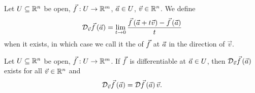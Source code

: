 \documentclass[main.tex]{subfiles}
\begin{document}
\begin{definition}
    Let $U\subseteq \mathbb R^n$ be open, $\vec{f} : U\to \mathbb R^m$, $\vec{a}\in U$, $\vec{v}\in \mathbb R^n$. We define
    \[\mathcal{D}_{\vec{v}}\vec{f}\left( \vec{a} \right) = \lim_{t\to 0} \frac{\vec{f}\left( \vec{a} + t\vec{v} \right) - \vec{f}\left( \vec{a} \right)}{t}\]
    when it exists, in which case we call it the  of $\vec{f}$ at $\vec{a}$ in the direction of $\vec{v}$.
\end{definition}

\begin{theorem}
    Let $U\subseteq \mathbb R^n$ be open, $\vec{f} : U \to \mathbb R^m$. If $\vec{f}$ is differentiable at $\vec{a}\in U$, then $\mathcal{D}_{\vec{v}}\vec{f}\left( \vec{a} \right)$ exists for all $\vec{v}\in \mathbb R^n$ and
    \[\mathcal{D}_{\vec{v}}\vec{f}\left( \vec{a} \right) = \mathcal{D}\vec{f}\left( \vec{a} \right)\vec{v}.\]
\end{theorem}
\end{document}
